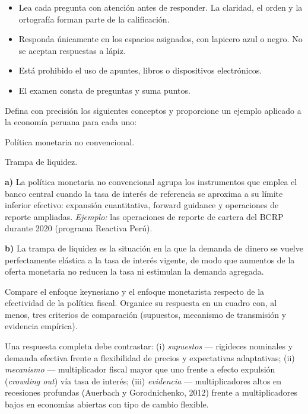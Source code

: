 \documentclass{academic-exam}
\begin{document}
\membrete

\begin{instrucciones}
\begin{itemize}
  \item Lea cada pregunta con atención antes de responder. La claridad,
        el orden y la ortografía forman parte de la calificación.
  \item Responda únicamente en los espacios asignados, con lapicero azul
        o negro. No se aceptan respuestas a lápiz.
  \item Está prohibido el uso de apuntes, libros o dispositivos electrónicos.
  \item El examen consta de \totalpreguntas{} preguntas y suma
        \totalpuntos{} puntos.
\end{itemize}
\end{instrucciones}


\begin{pregunta}[4]
Defina con precisión los siguientes conceptos y proporcione un ejemplo
aplicado a la economía peruana para cada uno:
\begin{apartados}
  \item Política monetaria no convencional. 
  \item Trampa de liquidez. 
\end{apartados}
\begin{solucion}
\textbf{a)} La política monetaria no convencional agrupa los instrumentos
que emplea el banco central cuando la tasa de interés de referencia se
aproxima a su límite inferior efectivo: expansión cuantitativa, forward
guidance y operaciones de reporte ampliadas. \emph{Ejemplo:} las
operaciones de reporte de cartera del BCRP durante 2020 (programa
Reactiva Perú).

\textbf{b)} La trampa de liquidez es la situación en la que la demanda de
dinero se vuelve perfectamente elástica a la tasa de interés vigente, de
modo que aumentos de la oferta monetaria no reducen la tasa ni estimulan
la demanda agregada.
\end{solucion}
\end{pregunta}

\begin{pregunta}[4]
Compare el enfoque keynesiano y el enfoque monetarista respecto de la
efectividad de la política fiscal. Organice su respuesta en un cuadro con,
al menos, tres criterios de comparación (supuestos, mecanismo de
transmisión y evidencia empírica).
\espaciorespuesta{7cm}
\begin{solucion}
Una respuesta completa debe contrastar: (i) \emph{supuestos} — rigideces
nominales y demanda efectiva frente a flexibilidad de precios y expectativas
adaptativas; (ii) \emph{mecanismo} — multiplicador fiscal mayor que uno
frente a efecto expulsión (\emph{crowding out}) vía tasa de interés;
(iii) \emph{evidencia} — multiplicadores altos en recesiones profundas
(Auerbach y Gorodnichenko, 2012) frente a multiplicadores bajos en
economías abiertas con tipo de cambio flexible.
\end{solucion}
\end{pregunta}
\end{document}
